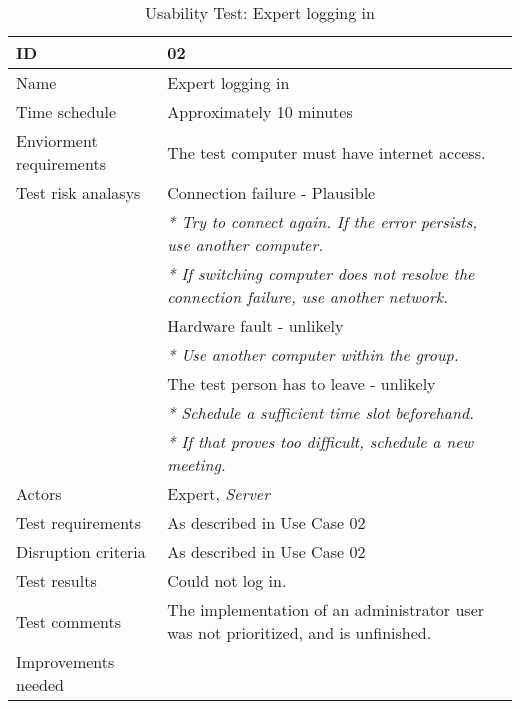 {\footnotesize
\begin{table}[H]
\begin{tabular}{| p{5cm} | p{10cm} |}\hline
	\textbf{ID}	& \textbf{02} \\ \hline
	Name		& Expert logging in\\ \hline
	Time schedule	& Approximately 10 minutes\\ \hline
	Enviorment requirements 
		& The test computer must have internet access. \\ \hline
	Test risk analasys 
		& Connection failure - Plausible \\
		& \emph{* Try to connect again. If the error persists, use another computer.} \\
		& \emph{* If switching computer does not resolve the connection failure, use another network.}\\
		& Hardware fault - unlikely \\
		& \emph{* Use another computer within the group.} \\
		& The test person has to leave - unlikely \\
		& \emph{* Schedule a sufficient time slot beforehand.} \\
		& \emph{* If that proves too difficult, schedule a new meeting.}\\ \hline
	Actors	& Expert, \emph{Server}\\ \hline
	Test requirements & As described in Use Case 02 \\ \hline
	Disruption criteria & As described in Use Case 02  \\ \hline
	Test results & Could not log in. \\ \hline
	Test comments & The implementation of an administrator user was not prioritized, and is unfinished.\\ \hline
	Improvements needed & \\ \hline
\end{tabular}


\caption{Usability Test: Expert logging in}
\label{fig:usability_test_2}
\end{table}}


